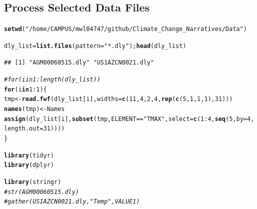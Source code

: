 \documentclass{article}\usepackage[]{graphicx}\usepackage[]{color}
\makeatletter
\newcommand{\hlnum}[1]{\textcolor[rgb]{0.686,0.059,0.569}{#1}}%
\newcommand{\hlstr}[1]{\textcolor[rgb]{0.192,0.494,0.8}{#1}}%
\newcommand{\hlcom}[1]{\textcolor[rgb]{0.678,0.584,0.686}{\textit{#1}}}%
\newcommand{\hlopt}[1]{\textcolor[rgb]{0,0,0}{#1}}%
\newcommand{\hlstd}[1]{\textcolor[rgb]{0.345,0.345,0.345}{#1}}%
\newcommand{\hlkwa}[1]{\textcolor[rgb]{0.161,0.373,0.58}{\textbf{#1}}}%
\newcommand{\hlkwb}[1]{\textcolor[rgb]{0.69,0.353,0.396}{#1}}%
\newcommand{\hlkwc}[1]{\textcolor[rgb]{0.333,0.667,0.333}{#1}}%
\newcommand{\hlkwd}[1]{\textcolor[rgb]{0.737,0.353,0.396}{\textbf{#1}}}%
\newenvironment{kframe}{%
 \def\at@end@of@kframe{}%
 \ifinner\ifhmode%
  \def\at@end@of@kframe{\end{minipage}}%
  \begin{minipage}{\columnwidth}%
 \fi\fi%
 \def\FrameCommand##1{\hskip\@totalleftmargin \hskip-\fboxsep
 \colorbox{shadecolor}{##1}\hskip-\fboxsep
     \hskip-\linewidth \hskip-\@totalleftmargin \hskip\columnwidth}%
 \MakeFramed {\advance\hsize-\width
   \@totalleftmargin\z@ \linewidth\hsize
   \@setminipage}}%
 {\par\unskip\endMakeFramed%
 \at@end@of@kframe}
\newenvironment{knitrout}{}{} %
\makeatother
\begin{document}
\subsection{Process Selected Data Files}

\begin{knitrout}
\color{fgcolor}\begin{kframe}
\begin{alltt}
\hlkwd{setwd}\hlstd{(}\hlstr{"/home/CAMPUS/mwl04747/github/Climate_Change_Narratives/Data"}\hlstd{)}

\hlstd{dly_list} \hlkwb{=} \hlkwd{list.files}\hlstd{(}\hlkwc{pattern}\hlstd{=}\hlstr{"*.dly"}\hlstd{);} \hlkwd{head}\hlstd{(dly_list)}
\end{alltt}
\begin{verbatim}
## [1] "AGM00060515.dly" "US1AZCN0021.dly"
\end{verbatim}
\begin{alltt}
\hlcom{#for (i in 1:length(dly_list)) }
\hlkwa{for} \hlstd{(i} \hlkwa{in} \hlnum{1}\hlopt{:}\hlnum{1}\hlstd{)\{}
\hlstd{tmp} \hlkwb{<-} \hlkwd{read.fwf}\hlstd{(dly_list[i],} \hlkwc{widths} \hlstd{=} \hlkwd{c}\hlstd{(}\hlnum{11}\hlstd{,} \hlnum{4}\hlstd{,} \hlnum{2}\hlstd{,} \hlnum{4}\hlstd{,} \hlkwd{rep}\hlstd{(}\hlkwd{c}\hlstd{(}\hlnum{5}\hlstd{,} \hlnum{1}\hlstd{,} \hlnum{1}\hlstd{,} \hlnum{1}\hlstd{),}\hlnum{31}\hlstd{)))}
\hlkwd{names}\hlstd{(tmp)} \hlkwb{<-} \hlstd{Names}
\hlkwd{assign}\hlstd{(dly_list[i],} \hlkwd{subset}\hlstd{(tmp, ELEMENT}\hlopt{==}\hlstr{"TMAX"}\hlstd{,} \hlkwc{select}\hlstd{=}\hlkwd{c}\hlstd{(}\hlnum{1}\hlopt{:}\hlnum{4}\hlstd{,} \hlkwd{seq}\hlstd{(}\hlnum{5}\hlstd{,} \hlkwc{by} \hlstd{=} \hlnum{4}\hlstd{,} \hlkwc{length.out}\hlstd{=}\hlnum{31}\hlstd{))))}
\hlstd{\}}

\hlkwd{library}\hlstd{(tidyr)}
\hlkwd{library}\hlstd{(dplyr)}
\end{alltt}


{\ttfamily\noindent\itshape\color{messagecolor}{\#\# \\\#\# Attaching package: 'dplyr'\\\#\# \\\#\# The following objects are masked from 'package:stats':\\\#\# \\\#\#\ \ \ \  filter, lag\\\#\# \\\#\# The following objects are masked from 'package:base':\\\#\# \\\#\#\ \ \ \  intersect, setdiff, setequal, union}}\begin{alltt}
\hlkwd{library}\hlstd{(stringr)}
\hlcom{#str(AGM00060515.dly)}
\hlcom{#gather(US1AZCN0021.dly, "Temp", VALUE1)}


\end{alltt}
\end{kframe}
\end{knitrout}
\end{document}
